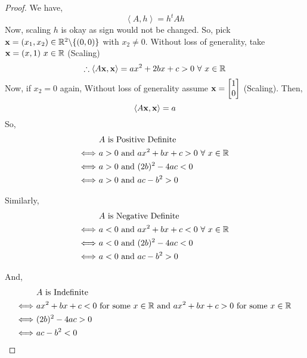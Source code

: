 \documentclass[../Analysis-3]{subfiles}
\begin{document}
\begin{proof}
    We have, \[ \left\langle A, h \right\rangle = h^tAh \]
    Now, scaling $h$ is okay as sign would not be changed. So, pick ${\bf x} = (x_1, x_2) \in \mathbb{R}^2 \backslash \{(0,0)\} $ with $x_2 \neq 0$.
    Without loss of generality, take ${\bf x} = (x,1) \ x \in \mathbb{R}$ (Scaling) \\
    \[ \therefore \left\langle A\bf{x}, \bf{x} \right\rangle = ax^2 + 2bx + c > 0 \ \forall\ x \in \mathbb{R} \]
    Now, if $x_2 = 0$ again, Without loss of generality assume ${\bf x} = \begin{bmatrix}
            1 \\
            0
        \end{bmatrix}$ (Scaling). Then, \[ \left\langle A\bf{x}, \bf{x} \right\rangle = a \]
    So,
    \begin{align*}
                            & \ A \text{ is Positive Definite}                         \\
        \Longleftrightarrow & \ a > 0 \text{ and } ax^2 + bx+c > 0 \ \forall\ x \in \mathbb{R} \\
        \Longleftrightarrow & \ a > 0 \text{ and } (2b)^2 - 4ac < 0                    \\
        \Longleftrightarrow & \ a > 0 \text{ and } ac - b^2 > 0
    \end{align*}

    Similarly,
    \begin{align*}
                            & \ A \text{ is Negative Definite}                         \\
        \Longleftrightarrow & \ a < 0 \text{ and } ax^2 + bx+c < 0 \ \forall\ x \in \mathbb{R} \\
        \Longleftrightarrow & \ a < 0 \text{ and } (2b)^2 - 4ac < 0                    \\
        \Longleftrightarrow & \ a < 0 \text{ and } ac - b^2 > 0
    \end{align*}

    And,
    \begin{align*}
                            & \ A \text{ is Indefinite}                                                                              \\
        \Longleftrightarrow & \ ax^2 + bx+c < 0 \ \text{for some } x \in \mathbb{R} \text{ and } ax^2 + bx+c > 0 \ \text{for some } x \in \mathbb{R} \\
        \Longleftrightarrow & \ (2b)^2 - 4ac > 0                                                                                     \\
        \Longleftrightarrow & \ ac - b^2 < 0
    \end{align*}
\end{proof}
\end{document}
